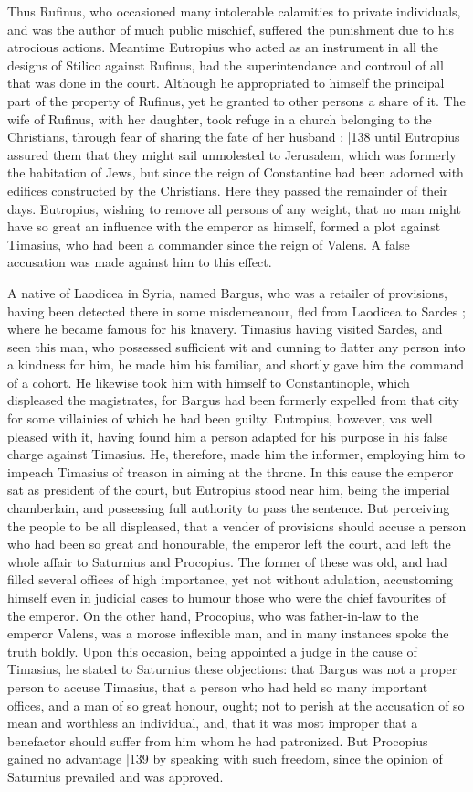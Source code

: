 Thus Rufinus, who occasioned many intolerable calamities to private individuals, and was the author of much public mischief, suffered the punishment due to his atrocious actions. Meantime Eutropius who acted as an instrument in all the designs of Stilico against Rufinus, had the superintendance and controul of all that was done in the court. Although he appropriated to himself the principal part of the property of Rufinus, yet he granted to other persons a share of it. The wife of Rufinus, with her daughter, took refuge in a church belonging to the Christians, through fear of sharing the fate of her husband ;
|138 until Eutropius assured them that they might sail unmolested to Jerusalem, which was formerly the habitation of Jews, but since the reign of Constantine had been adorned with edifices constructed by the Christians. Here they passed the remainder of their days. Eutropius, wishing to remove all persons of any weight, that no man might have so great an influence with the emperor as himself, formed a plot against Timasius, who had been a commander since the reign of Valens. A false accusation was made against him to this effect.

A native of Laodicea in Syria, named Bargus, who was a retailer of provisions, having been detected there in some misdemeanour, fled from Laodicea to Sardes ; where he became famous for his knavery. Timasius having visited Sardes, and seen this man, who possessed sufficient wit and cunning to flatter any person into a kindness for him, he made him his familiar, and shortly gave him the command of a cohort. He likewise took him with himself to Constantinople, which displeased the magistrates, for Bargus had been formerly expelled from that city for some villainies of which he had been guilty. Eutropius, however, vas well pleased with it, having found him a person adapted for his purpose in his false charge against Timasius. He, therefore, made him the informer, employing him to impeach Timasius of treason in aiming at the throne. In this cause the emperor sat as president of the court, but Eutropius stood near him, being the imperial chamberlain, and possessing full authority to pass the sentence. But perceiving the people to be all displeased, that a vender of provisions should accuse a person who had been so great and honourable, the emperor left the court, and left the whole affair to Saturnius and Procopius. The former of these was old, and had filled several offices of high importance, yet not without adulation, accustoming himself even in judicial cases to humour those who were the chief favourites of the emperor. On the other hand, Procopius, who was father-in-law to the emperor Valens, was a morose inflexible man, and in many instances spoke the truth boldly. Upon this occasion, being appointed a judge in the cause of Timasius, he stated to Saturnius these objections: that Bargus was not a proper person to accuse Timasius, that a person who had held so many important offices, and a man of so great honour, ought; not to perish at the accusation of so mean and worthless an individual, and, that it was most improper that a benefactor should suffer from him whom he had patronized. But Procopius gained no advantage
|139 by speaking with such freedom, since the opinion of Saturnius prevailed and was approved.

